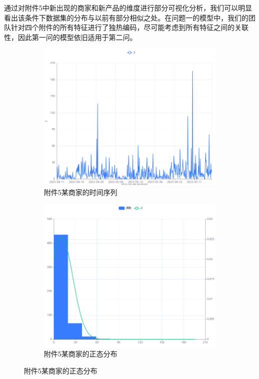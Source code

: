 \documentclass[withoutpreface,bwprint]{cumcmthesis}
\begin{document}
通过对附件5中新出现的商家和新产品的维度进行部分可视化分析，我们可以明显看出该条件下数据集的分布与以前有部分相似之处。在问题一的模型中，我们的团队针对四个附件的所有特征进行了独热编码，尽可能考虑到所有特征之间的关联性，因此第一问的模型依旧适用于第二问。
    \begin{figure}[htbp]
      \centering
        \begin{subfigure}{0.4\textwidth}
          \includegraphics[width=\textwidth]{figure/附件5某商家的时间序列.png}
          \caption{附件5某商家的时间序列}
          \label{附件5某商家的时间序列}
        \end{subfigure}
        \begin{subfigure}{0.4\textwidth}
          \includegraphics[width=\textwidth]{figure/附件5某商家的正态分布.png}
          \caption{附件5某商家的正态分布}
          \label{附件5某商家的正态分布}
        \end{subfigure}
    \end{figure}
\end{document}

